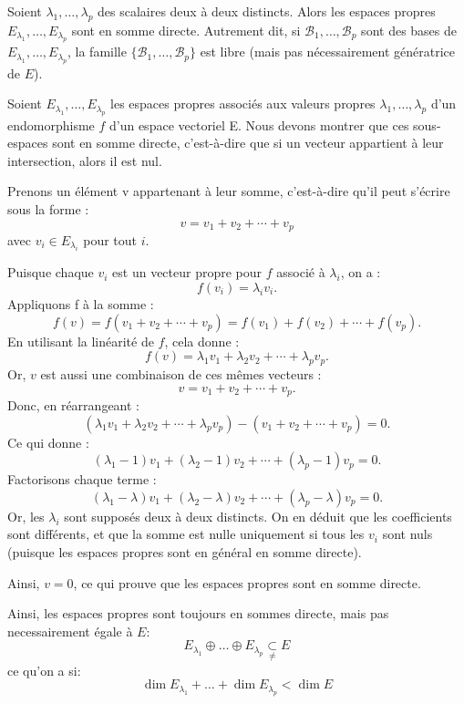 \begin{prop}
    Soient $\lambda_1, \ldots, \lambda_p$ des scalaires deux à deux distincts. Alors les espaces propres $E_{\lambda_1}, \ldots, E_{\lambda_p}$ sont en somme directe. Autrement dit, si $\mathcal{B}_1, \ldots, \mathcal{B}_p$ sont des bases de $E_{\lambda_1}, \ldots, E_{\lambda_p}$, la famille $\{\mathcal{B}_1, \ldots, \mathcal{B}_p\}$ est libre (mais pas nécessairement génératrice de $E$).
\end{prop}
\begin{preuve}
Soient $E_{\lambda_1}, \ldots, E_{\lambda_p}$ les espaces propres associés aux valeurs propres $\lambda_1, \ldots, \lambda_p$ d’un endomorphisme $f$ d’un espace vectoriel E. Nous devons montrer que ces sous-espaces sont en somme directe, c’est-à-dire que si un vecteur appartient à leur intersection, alors il est nul.

Prenons un élément v appartenant à leur somme, c’est-à-dire qu’il peut s’écrire sous la forme :
\[
    v = v_1 + v_2 + \cdots + v_p
\] 
avec $v_i \in E_{\lambda_i}$ pour tout $i$.

Puisque chaque $v_i$ est un vecteur propre pour $f$ associé à $\lambda_i$, on a :
\[
    f(v_i) = \lambda_i v_i.
\] 
Appliquons f à la somme :
\[
    f(v) = f(v_1 + v_2 + \cdots + v_p) = f(v_1) + f(v_2) + \cdots + f(v_p).
\] 
En utilisant la linéarité de $f$, cela donne :
\[
    f(v) = \lambda_1 v_1 + \lambda_2 v_2 + \cdots + \lambda_p v_p.
\] 
Or, $v$ est aussi une combinaison de ces mêmes vecteurs :
\[
    v = v_1 + v_2 + \cdots + v_p.
\] 
Donc, en réarrangeant :
\[
    (\lambda_1 v_1 + \lambda_2 v_2 + \cdots + \lambda_p v_p) - (v_1 + v_2 + \cdots + v_p) = 0.
\] 
Ce qui donne :
\[
    (\lambda_1 - 1) v_1 + (\lambda_2 - 1) v_2 + \cdots + (\lambda_p - 1) v_p = 0.
\] 
Factorisons chaque terme :
\[
    (\lambda_1 - \lambda) v_1 + (\lambda_2 - \lambda) v_2 + \cdots + (\lambda_p - \lambda) v_p = 0.
\] 
Or, les $\lambda_i$ sont supposés deux à deux distincts. On en déduit que les coefficients sont différents, et que la somme est nulle uniquement si tous les $v_i$ sont nuls (puisque les espaces propres sont en général en somme directe).

Ainsi, $v = 0$, ce qui prouve que les espaces propres sont en somme directe.
\end{preuve}
Ainsi, les espaces propres sont toujours en sommes directe, mais pas necessairement égale à $E$:
 \[
     E_{\lambda_1} \oplus \ldots \oplus E_{\lambda_p} \underset{\neq}{\subset} E
\] 
ce qu'on a si:
\[
\dim E_{\lambda_1} + \ldots + \dim E_{\lambda_p} < \dim E
\] 

